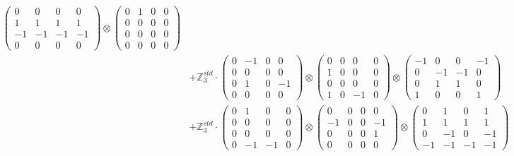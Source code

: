 \documentclass{article}
\begin{document}
{\begin{align}
            \begin{pmatrix} 0 & 0 & 0 & 0 \\ 1 & 1 & 1 & 1 \\ -1 & -1 & -1 & -1 \\ 0 & 0 & 0 & 0 \end{pmatrix} \otimes 
            \begin{pmatrix} 0 & 1 & 0 & 0 \\ 0 & 0 & 0 & 0 \\ 0 & 0 & 0 & 0 \\ 0 & 0 & 0 & 0 \end{pmatrix} \\ 
        &+ \label{Rs16-Rc11-Solution-7-c20} \mathbb{Z}_3^{std} \cdot 
            \begin{pmatrix} 0 & -1 & 0 & 0 \\ 0 & 0 & 0 & 0 \\ 0 & 1 & 0 & -1 \\ 0 & 0 & 0 & 0 \end{pmatrix} \otimes 
            \begin{pmatrix} 0 & 0 & 0 & 0 \\ 1 & 0 & 0 & 0 \\ 0 & 0 & 0 & 0 \\ 1 & 0 & -1 & 0 \end{pmatrix} \otimes 
            \begin{pmatrix} -1 & 0 & 0 & -1 \\ 0 & -1 & -1 & 0 \\ 0 & 1 & 1 & 0 \\ 1 & 0 & 0 & 1 \end{pmatrix} \\ 
        &+ \label{Rs16-Rc11-Solution-7-c21} \mathbb{Z}_3^{std} \cdot 
            \begin{pmatrix} 0 & 1 & 0 & 0 \\ 0 & 0 & 0 & 0 \\ 0 & 0 & 0 & 0 \\ 0 & -1 & -1 & 0 \end{pmatrix} \otimes 
            \begin{pmatrix} 0 & 0 & 0 & 0 \\ -1 & 0 & 0 & -1 \\ 0 & 0 & 0 & 1 \\ 0 & 0 & 0 & 0 \end{pmatrix} \otimes 
            \begin{pmatrix} 0 & 1 & 0 & 1 \\ 1 & 1 & 1 & 1 \\ 0 & -1 & 0 & -1 \\ -1 & -1 & -1 & -1 \end{pmatrix} \\ 

\end{align}}
\end{document}
